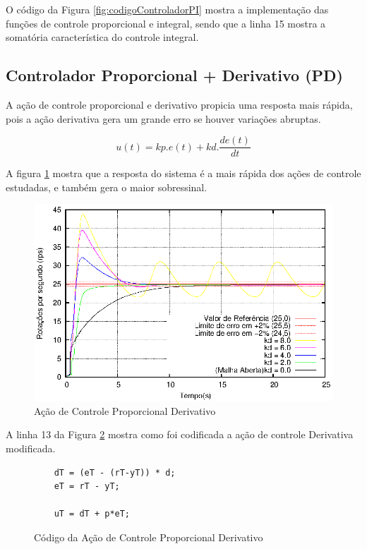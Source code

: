 O código da Figura \ref{fig:codigoControladorPI} mostra a implementação das funções de controle proporcional e integral, sendo que a linha 15 mostra a somatória característica do controle integral.










\subsection{ Controlador Proporcional + Derivativo (PD) }

A ação de controle proporcional e derivativo propicia uma resposta mais rápida, pois a ação derivativa gera um grande erro se houver variações abruptas.

\begin{equation}
u(t) = kp.e(t) + kd. \frac{d e(t)}{dt}
\end{equation}

A figura \ref{fig:acaoPD} mostra que a resposta do sistema é a mais rápida dos ações de controle estudadas, e também gera o maior sobressinal. 


\begin{figure}[!htb]
\center\includegraphics[scale=1.1]{./imagens/acaoPD.eps}
\caption{Ação de Controle Proporcional Derivativo}
\label{fig:acaoPD}
\end{figure}

 A linha 13 da Figura \ref{fig:codigoControladorPD} mostra como foi codificada a ação de controle Derivativa modificada.

\begin{figure}[!htb]
\centering
\begin{minipage}{0.8\linewidth}
\lstset{firstnumber=13}
\begin{lstlisting}
    dT = (eT - (rT-yT)) * d;
    eT = rT - yT;

    uT = dT + p*eT;
\end{lstlisting}
\end{minipage}
\caption{Código da Ação de Controle Proporcional Derivativo}
\label{fig:codigoControladorPD}
\end{figure}

